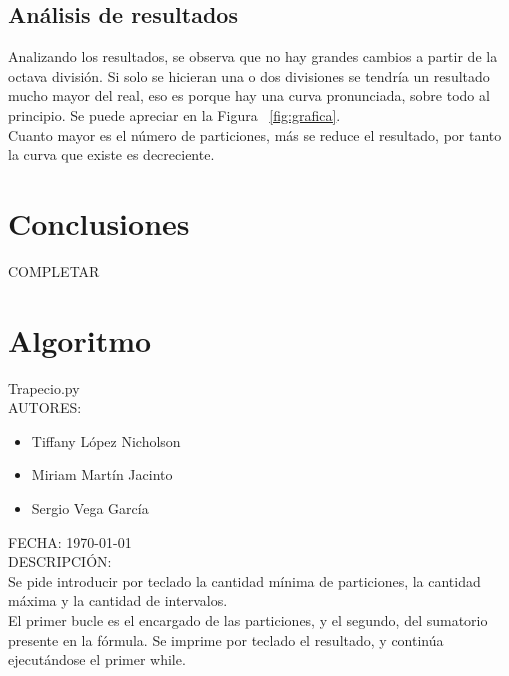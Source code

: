 \documentclass{article}
\begin{document}
    \subsection{Análisis de resultados}

     Analizando los resultados, se observa que no hay grandes cambios a partir de la octava división. Si solo se hicieran una o dos divisiones se tendría un resultado mucho mayor del real, eso es porque hay una curva pronunciada, sobre todo al principio. Se puede apreciar en la Figura ~\ref{fig:grafica}.\\

     Cuanto mayor es el número de particiones, más se reduce el resultado, por tanto la curva que existe es decreciente.\\


    \pagebreak

   \section{Conclusiones}
    COMPLETAR
   \pagebreak

   \section{Algoritmo}

   Trapecio.py\\
   
   AUTORES:

   \begin{itemize}
     \item Tiffany López Nicholson
     \item Miriam Martín Jacinto
     \item Sergio Vega García
   \end{itemize}

   FECHA: \today \\

   DESCRIPCIÓN:\\

     Se pide introducir por teclado la cantidad mínima de particiones, la cantidad máxima y la cantidad de intervalos.\\

     El primer bucle es el encargado de las particiones, y el segundo, del sumatorio presente en la fórmula. Se imprime por teclado el resultado, y continúa ejecutándose el primer while.
   

\end{document}
